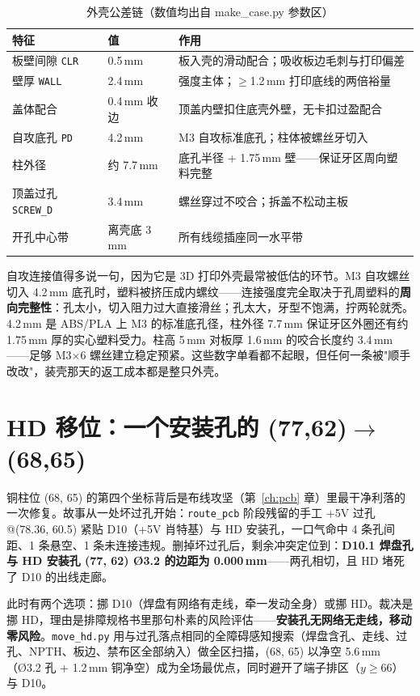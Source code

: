 \begin{table}[htbp]
  \centering
  \caption{外壳公差链（数值均出自 make\_case.py 参数区）}
  \label{tab:encl-tol}
  \begin{tabular}{llp{5.6cm}}
    \toprule
    特征 & 值 & 作用 \\
    \midrule
    板壁间隙 \texttt{CLR} & 0.5\,mm & 板入壳的滑动配合；吸收板边毛刺与打印偏差 \\
    壁厚 \texttt{WALL} & 2.4\,mm & 强度主体；$\ge$1.2\,mm 打印底线的两倍裕量 \\
    盖体配合 & 0.4\,mm 收边 & 顶盖内壁扣住底壳外壁，无卡扣过盈配合 \\
    自攻底孔 \texttt{PD} & 4.2\,mm & M3 自攻标准底孔；柱体被螺丝牙切入 \\
    柱外径 & 约 7.7\,mm & 底孔半径 + 1.75\,mm 壁——保证牙区周向塑料完整 \\
    顶盖过孔 \texttt{SCREW\_D} & 3.4\,mm & 螺丝穿过不咬合；拆盖不松动主板 \\
    开孔中心带 & 离壳底 3\,mm & 所有线缆插座同一水平带 \\
    \bottomrule
  \end{tabular}
\end{table}

自攻连接值得多说一句，因为它是 3D 打印外壳最常被低估的环节。M3 自攻螺丝切入 4.2\,mm 底孔时，塑料被挤压成内螺纹——连接强度完全取决于孔周塑料的\textbf{周向完整性}：孔太小，切入阻力过大直接滑丝；孔太大，牙型不饱满，拧两轮就秃。4.2\,mm 是 ABS/PLA 上 M3 的标准底孔径，柱外径 7.7\,mm 保证牙区外圈还有约 1.75\,mm 厚的实心塑料受力。柱高 5\,mm 对板厚 1.6\,mm 的咬合长度约 3.4\,mm——足够 M3$\times$6 螺丝建立稳定预紧。这些数字单看都不起眼，但任何一条被"顺手改改"，装壳那天的返工成本都是整只外壳。

\section{HD 移位：一个安装孔的 (77,62)$\to$(68,65)}
\label{sec:encl-hd}

铜柱位 (68, 65) 的第四个坐标背后是布线攻坚（第~\ref{ch:pcb} 章）里最干净利落的一次修复。故事从一处坏过孔开始：\texttt{route\_pcb} 阶段残留的手工 +5V 过孔 @(78.36, 60.5) 紧贴 D10（+5V 肖特基）与 HD 安装孔，一口气命中 4 条孔间距、1 条悬空、1 条未连接违规。删掉坏过孔后，剩余冲突定位到：\textbf{D10.1 焊盘孔与 HD 安装孔 (77, 62) Ø3.2 的边距为 0.000\,mm}——两孔相切，且 HD 堵死了 D10 的出线走廊。

此时有两个选项：挪 D10（焊盘有网络有走线，牵一发动全身）或挪 HD。裁决是挪 HD，理由是排障规格书里那句朴素的风险评估——\textbf{安装孔无网络无走线，移动零风险}。\texttt{move\_hd.py} 用与过孔落点相同的全障碍感知搜索（焊盘含孔、走线、过孔、NPTH、板边、禁布区全部纳入）做全区扫描，(68, 65) 以净空 5.6\,mm（Ø3.2 孔 + 1.2\,mm 铜净空）成为全场最优点，同时避开了端子排区（$y\ge66$）与 D10。


